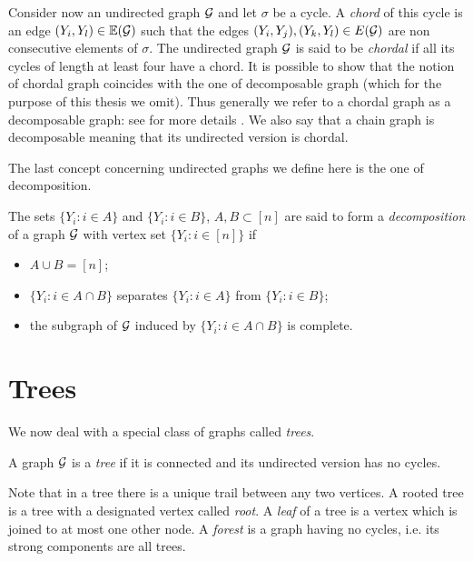 Consider now an undirected graph $\mathcal{G}$ and let $\sigma$ be a cycle. A \textit{chord} of this cycle is an edge $(Y_i,Y_l)\in \mathbb{E}(\mathcal{G})$ such that the edges $(Y_i,Y_j),(Y_k,Y_l)\in E(\mathcal{G})$ are non consecutive elements of $\sigma$.  The undirected graph $\mathcal{G}$ is said to be \textit{chordal} if all its cycles of length at least four have a chord. It is possible to show that the notion of chordal graph coincides with the one of decomposable graph (which for the purpose of this thesis we omit). Thus generally we refer to a chordal graph as a decomposable graph: see for more details \citet{Cowell1999a}. We also say that a chain graph is decomposable meaning that its undirected version is chordal. 

The last concept concerning undirected graphs we define here is the one of decomposition.
\begin{definition}
The sets $\{Y_i:i\in A\}$ and $\{Y_i:i\in B\}$, $A,B\subset [n]$ are said to form a \emph{decomposition} of a graph $\mathcal{G}$ with vertex set $\{Y_i:i\in[n]\}$ if
\begin{itemize}
\item $A\cup B=[n]$;
\item $\{Y_i:i\in A\cap B\}$ separates $\{Y_i:i\in A\}$ from $\{Y_i:i\in  B\}$;
\item the subgraph of $\mathcal{G}$ induced by $\{Y_i:i\in A\cap B\}$ is complete.
\end{itemize}
\end{definition}

\section{Trees}
We now deal with a special class of graphs called \textit{trees}. 
\begin{definition}
\label{def:tree}
A graph $\mathcal{G}$ is a \emph{tree} if it is connected and its undirected version has no cycles. 
\end{definition}

Note that in a tree there is a unique trail between any two vertices. A rooted tree is a tree with a designated vertex called  \textit{root}.  A \textit{leaf} of a tree is a vertex which is joined to at most one other node. A \textit{forest} is a graph having no cycles, i.e. its strong components are all trees.  

